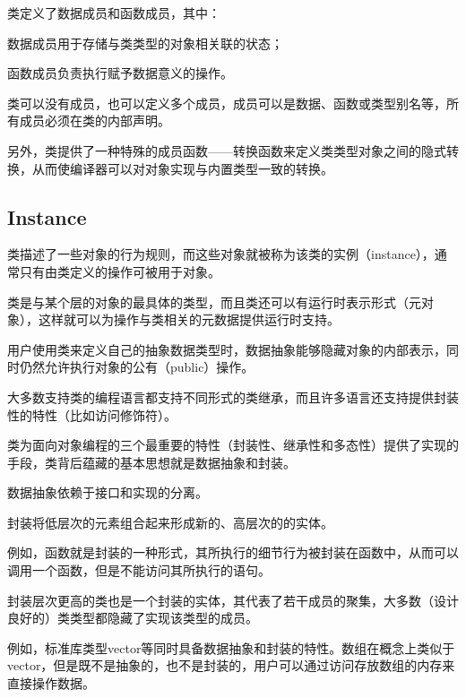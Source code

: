 类定义了数据成员和函数成员，其中：

\begin{compactitem}
\item 数据成员用于存储与类类型的对象相关联的状态；
\item 函数成员负责执行赋予数据意义的操作。
\end{compactitem}

类可以没有成员，也可以定义多个成员，成员可以是数据、函数或类型别名等，所有成员必须在类的内部声明。



另外，类提供了一种特殊的成员函数——转换函数来定义类类型对象之间的隐式转换，从而使编译器可以对对象实现与内置类型一致的转换。


\subsection{Instance}



类描述了一些对象的行为规则，而这些对象就被称为该类的实例（instance），通常只有由类定义的操作可被用于对象。





类是与某个层的对象的最具体的类型，而且类还可以有运行时表示形式（元对象），这样就可以为操作与类相关的元数据提供运行时支持。

用户使用类来定义自己的抽象数据类型时，数据抽象能够隐藏对象的内部表示，同时仍然允许执行对象的公有（public）操作。


大多数支持类的编程语言都支持不同形式的类继承，而且许多语言还支持提供封装性的特性（比如访问修饰符）。

类为面向对象编程的三个最重要的特性（封装性、继承性和多态性）提供了实现的手段，类背后蕴藏的基本思想就是数据抽象和封装。

\begin{compactitem}
\item 数据抽象依赖于接口和实现的分离。
\item 封装将低层次的元素组合起来形成新的、高层次的的实体。
\end{compactitem}

例如，函数就是封装的一种形式，其所执行的细节行为被封装在函数中，从而可以调用一个函数，但是不能访问其所执行的语句。

封装层次更高的类也是一个封装的实体，其代表了若干成员的聚集，大多数（设计良好的）类类型都隐藏了实现该类型的成员。

例如，标准库类型vector等同时具备数据抽象和封装的特性。数组在概念上类似于vector，但是既不是抽象的，也不是封装的，用户可以通过访问存放数组的内存来直接操作数据。


